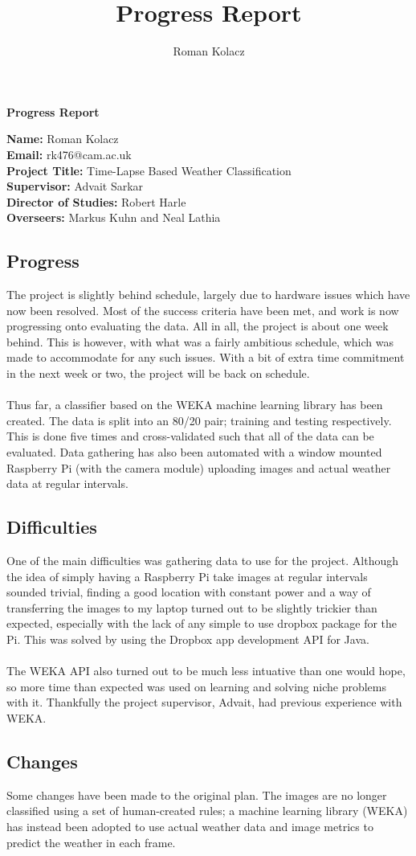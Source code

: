 \documentclass[12pt]{article}
\begin{document}
\title{Progress Report}
\author{Roman Kolacz}

\noindent
{\large\bf Progress Report}

\bigskip

\noindent
{\bf Name:} Roman Kolacz \\
{\bf Email:} rk476@cam.ac.uk \\
{\bf Project Title:} Time-Lapse Based Weather Classification \\
{\bf Supervisor:} Advait Sarkar \\
{\bf Director of Studies:} Robert Harle \\
{\bf Overseers:} Markus Kuhn and Neal Lathia \\


\subsection*{Progress}
The project is slightly behind schedule, largely due to hardware issues which have now been resolved. Most of the success criteria have been met, and work is now progressing onto evaluating the data. All in all, the project is about one week behind. This is however, with what was a fairly ambitious schedule, which was made to accommodate for any such issues. With a bit of extra time commitment in the next week or two, the project will be back on schedule.
\\\\
\noindent
Thus far, a classifier based on the WEKA machine learning library has been created. The data is split into an 80/20 pair; training and testing respectively. This is done five times and cross-validated such that all of the data can be evaluated. Data gathering has also been automated with a window mounted Raspberry Pi (with the camera module) uploading images and actual weather data at regular intervals.

\subsection*{Difficulties}
One of the main difficulties was gathering data to use for the project. Although the idea of simply having a Raspberry Pi take images at regular intervals sounded trivial, finding a good location with constant power and a way of transferring the images to my laptop turned out to be slightly trickier than expected, especially with the lack of any simple to use dropbox package for the Pi. This was solved by using the Dropbox app development API for Java.
\\\\
\noindent
The WEKA API also turned out to be much less intuative than one would hope, so more time than expected was used on learning and solving niche problems with it. Thankfully the project supervisor, Advait, had previous experience with WEKA.

\subsection*{Changes}
Some changes have been made to the original plan. The images are no longer classified using a set of human-created rules; a machine learning library (WEKA) has instead been adopted to use actual weather data and image metrics to predict the weather in each frame.
\end{document}
